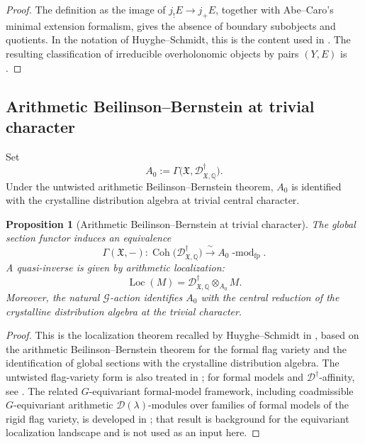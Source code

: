 \documentclass[11pt]{amsart}
\theoremstyle{plain}
\newtheorem{proposition}{Proposition}[section]
\theoremstyle{definition}
\theoremstyle{remark}
\newcommand{\Coh}{\operatorname{Coh}}
\newcommand{\Loc}{\operatorname{Loc}}
\begin{document}
\begin{proof}
The definition as the image of \(j_!E\to j_+E\), together with Abe--Caro's
minimal extension formalism, gives the absence of boundary subobjects and
quotients. In the notation of Huyghe--Schmidt, this is the content used in
\cite[Proposition 2.3.3]{HuygheSchmidtIntermediate}. The resulting
classification of irreducible overholonomic objects by pairs \((Y,E)\) is
\cite[Theorem 2.3.4]{HuygheSchmidtIntermediate}.
\end{proof}

\subsection{Arithmetic Beilinson--Bernstein at trivial character}

Set
\[
  A_0:=\Gamma\bigl(\mathfrak X,
  \mathscr D^\dagger_{\mathfrak X,\mathbb Q}\bigr).
\]
Under the untwisted arithmetic Beilinson--Bernstein theorem, \(A_0\) is
identified with the crystalline distribution algebra at trivial central
character.

\begin{proposition}[Arithmetic Beilinson--Bernstein at trivial character]
\label{prop:ABB-trivial}
The global section functor induces an equivalence
\[
  \Gamma(\mathfrak X,-):
  \Coh\bigl(\mathscr D^\dagger_{\mathfrak X,\mathbb Q}\bigr)
  \xrightarrow{\;\sim\;}
  A_0\operatorname{-mod}_{\mathrm{fp}}.
\]
A quasi-inverse is given by arithmetic localization:
\[
  \Loc(M)=
  \mathscr D^\dagger_{\mathfrak X,\mathbb Q}
  \otimes_{A_0}M.
\]
Moreover, the natural \(\mathcal G\)-action identifies \(A_0\) with the
central reduction of the crystalline distribution algebra at the trivial
character.
\end{proposition}

\begin{proof}
This is the localization theorem recalled by Huyghe--Schmidt in
\cite[Theorem 4.2.1]{HuygheSchmidtIntermediate}, based on the arithmetic
Beilinson--Bernstein theorem for the formal flag variety and the identification
of global sections with the crystalline distribution algebra. The untwisted
flag-variety form is also treated in \cite[Theorem 3.2.1]{HuygheSchmidtFlag};
for formal models and \(\mathscr D^\dagger\)-affinity, see
\cite[Theorem 5.2]{HuyghePatelSchmidtStrauch}.  The related
\(G\)-equivariant formal-model framework, including coadmissible
\(G\)-equivariant arithmetic \(\mathcal D(\lambda)\)-modules over families of
formal models of the rigid flag variety, is developed in
\cite{SarrazolaRendiconti}; that result is background for the equivariant
localization landscape and is not used as an input here.
\end{proof}
\end{document}
